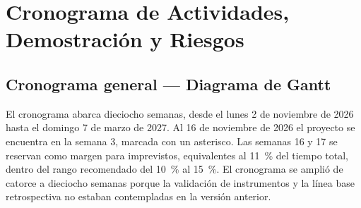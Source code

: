 \section{Cronograma de Actividades, Demostración y Riesgos}\label{cap:cronograma}

\subsection{Cronograma general — Diagrama de Gantt}

El cronograma abarca dieciocho semanas, desde el lunes 2 de noviembre de 2026 hasta el domingo 7 de marzo de 2027. Al 16 de noviembre de 2026 el proyecto se encuentra en la semana 3, marcada con un asterisco. Las semanas 16 y 17 se reservan como margen para imprevistos, equivalentes al 11~\% del tiempo total, dentro del rango recomendado del 10~\% al 15~\%. El cronograma se amplió de catorce a dieciocho semanas porque la validación de instrumentos y la línea base retrospectiva no estaban contempladas en la versión anterior.


